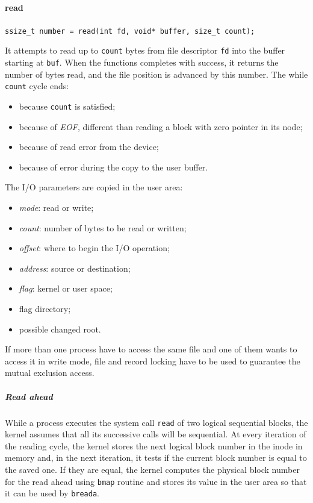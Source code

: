 \paragraph{read}
\texttt{ssize\_t number = read(int fd, void* buffer, size\_t count);}

It attempts to read up to \texttt{count} bytes from file descriptor \texttt{fd} into the buffer starting at \texttt{buf}. When the functions completes with success, it returns the number of bytes read, and the file position is advanced by this number. The while \texttt{count} cycle ends:
\begin{itemize}
\item because \texttt{count} is satisfied;
\item because of \emph{EOF}, different than reading a block with zero pointer in its node;
\item because of read error from the device;
\item because of error during the copy to the user buffer.
\end{itemize}
The I/O parameters are copied in the user area:
\begin{itemize}
\item \emph{mode}: read or write;
\item \emph{count}: number of bytes to be read or written;
\item \emph{offset}: where to begin the I/O operation;
\item \emph{address}: source or destination;
\item \emph{flag}: kernel or user space;
\item flag directory;
\item possible changed root.
\end{itemize}
If more than one process have to access the same file and one of them wants to access it in write mode, file and record locking have to be used to guarantee the mutual exclusion access.

\subparagraph{Read ahead}
While a process executes the system call \texttt{read} of two logical sequential blocks, the kernel assumes that all its successive calls will be sequential. At every iteration of the reading cycle, the kernel stores the next logical block number in the inode in memory and, in the next iteration, it tests if the current block number is equal to the saved one. If they are equal, the kernel computes the physical block number for the read ahead using \texttt{bmap} routine and stores its value in the user area so that it can be used by \texttt{breada}.

